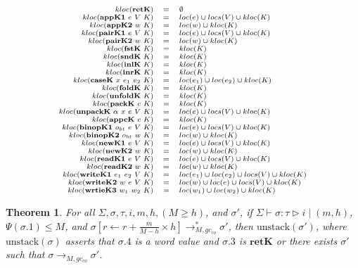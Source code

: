 \documentclass[fleqn]{article}
\newtheorem{theorem}{Theorem}
\begin{document}
\[
\scriptsize
\begin{array}{rcl}
	kloc(\mathbf{retK}) & = & \emptyset \\
	kloc(\mathbf{appK1}~e~V~K) & = & loc(e) \cup locs(V) \cup kloc(K) \\
	kloc(\mathbf{appK2}~w~K) & = & loc(w) \cup kloc(K) \\
	kloc(\mathbf{pairK1}~e~V~K) & = & loc(e) \cup locs(V) \cup kloc(K) \\
	kloc(\mathbf{pairK2}~w~K) & = & loc(w) \cup kloc(K) \\
	kloc(\mathbf{fstK}~K) & = & kloc(K) \\
	kloc(\mathbf{sndK}~K) & = & kloc(K) \\
	kloc(\mathbf{inlK}~K) & = & kloc(K) \\
	kloc(\mathbf{inrK}~K) & = & kloc(K) \\
	kloc(\mathbf{caseK}~x~e_1~e_2~K) & = & loc(e_1) \cup loc(e_2) \cup kloc(K) \\
	kloc(\mathbf{foldK}~K) & = & kloc(K) \\
	kloc(\mathbf{unfoldK}~K) & = & kloc(K) \\
	kloc(\mathbf{packK}~c~K) & = & kloc(K) \\
	kloc(\mathbf{unpackK}~\alpha~x~e~V~K) & = & loc(e) \cup locs(V) \cup kloc(K) \\
	kloc(\mathbf{appcK}~c~K) & = & kloc(K) \\
	kloc(\mathbf{binopK1}~o_{bt}~e~V~K) & = & loc(e) \cup locs(V) \cup kloc(K) \\
	kloc(\mathbf{binopK2}~o_{bt}~w~K) & = & loc(w) \cup kloc(K) \\
	kloc(\mathbf{newK1}~e~V~K) & = & loc(e) \cup locs(V) \cup kloc(K) \\
	kloc(\mathbf{newK2}~w~K) & = & loc(w) \cup kloc(K) \\
	kloc(\mathbf{readK1}~e~V~K) & = & loc(e) \cup locs(V) \cup kloc(K) \\
	kloc(\mathbf{readK2}~w~K) & = & loc(w) \cup kloc(K) \\
	kloc(\mathbf{writeK1}~e_1~e_2~V~K) & = & loc(e_1) \cup loc(e_2) \cup locs(V) \cup kloc(K) \\
	kloc(\mathbf{writeK2}~w~e~V~K) & = & loc(w) \cup loc(e) \cup locs(V) \cup kloc(K) \\
	kloc(\mathbf{wrtieK3}~w_1~w_2~K) & = & loc(w_1) \cup loc(w_2) \cup kloc(K)
\end{array}
\]

\begin{theorem}
	For all $\Sigma,\sigma,\tau,i,m,h,(M \ge h)$, and $\sigma'$, if $\Sigma \vdash \sigma : \tau \triangleright i \mid (m,h)$, $\Psi(\sigma.1) \le M$, and $\sigma[r \leftarrow r+ \frac{m}{M-h}\times h] \longrightarrow_{M,gc_{co}}^* \sigma'$,
	then $\mathrm{unstack}(\sigma')$, where $\mathrm{unstack}(\sigma)$ asserts that $\sigma.4$ is a word value and $\sigma.3$ is $\mathbf{retK}$ or there exists $\sigma'$ such that $\sigma \longrightarrow_{M,gc_{co}} \sigma'$.
\end{theorem}
\end{document}
